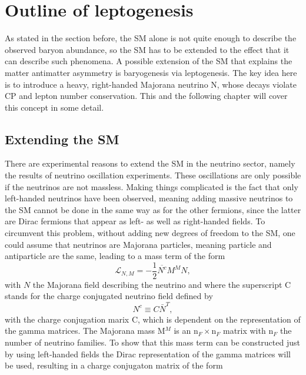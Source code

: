 \chapter{Outline of leptogenesis}
As stated in the section before, the SM alone is not quite enough to describe the observed baryon abundance, so the SM has to be extended to the effect that it can describe such phenomena. \newline\indent
A possible extension of the SM that explains the matter antimatter asymmetry is baryogenesis via leptogenesis. The key idea here is to introduce a heavy, right-handed Majorana neutrino N, whose decays violate CP and lepton number conservation. \newline\indent
This and the following chapter will cover this concept in some detail.
\section{Extending the SM}
There are experimental reasons to extend the SM in the neutrino sector, namely the results of neutrino oscillation experiments. These oscillations are only possible if the neutrinos are not massless. Making things complicated is the fact that only left-handed neutrinos have been observed, meaning adding massive neutrinos to the SM cannot be done in the same way as for the other fermions, since the latter are Dirac fermions that appear as left- as well as right-handed fields. To circumvent this problem, without adding new degrees of freedom to the SM, one could assume that neutrinos are Majorana particles, meaning particle and antiparticle are the same, leading to a mass term of the form \cite{Drewes:2013gca}
\begin{equation}
\mathcal{L}_{N,M}=-\frac{1}{2}\overline{N^c}M^MN,
\label{eq:neutrino_majorana}
\end{equation}
with $N$ the Majorana field describing the neutrino and where the superscript C stands for the charge conjugated neutrino field defined by
\begin{equation*}
	N^c\equiv C\bar{N}^T,
\end{equation*}
with the charge conjugation marix C, which is dependent on the representation of the gamma matrices. The Majorana mass M$^M$ is an n$_F\times$n$_F$ matrix with n$_F$ the number of neutrino families. \newline\indent
To show that this mass term can be constructed just by using left-handed fields the Dirac representation of the gamma matrices will be used, resulting in a charge conjugaton matrix of the form
